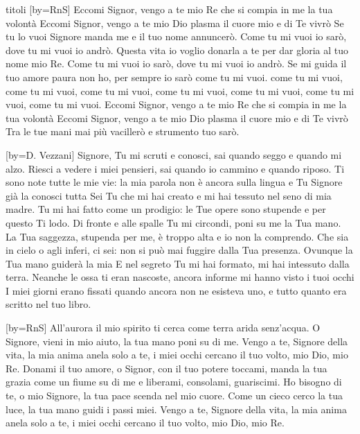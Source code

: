\begin{songs}{titoli}
[by={RnS}]
\beginverse
Eccomi Signor, vengo a te mio Re
che si compia in me la tua volontà
Eccomi Signor, vengo a te mio Dio
plasma il cuore mio e di Te vivrò
Se tu lo vuoi Signore manda me
e il tuo nome annuncerò.
\endverse
\beginchorus
Come tu mi vuoi io sarò,
dove tu mi vuoi io andrò.
Questa vita io voglio donarla a te
per dar gloria al tuo nome mio Re.
Come tu mi vuoi io sarò,
dove tu mi vuoi io andrò.
Se mi guida il tuo amore paura non ho,
per sempre io sarò
come tu mi vuoi.
come tu mi vuoi, come tu mi vuoi,
come tu mi vuoi, come tu mi vuoi,
come tu mi vuoi, come tu mi vuoi,
come tu mi vuoi.
\endchorus
\beginverse
Eccomi Signor, vengo a te mio Re
che si compia in me la tua volontà
Eccomi Signor, vengo a te mio Dio
plasma il cuore mio e di Te vivrò
Tra le tue mani mai più vacillerò
e strumento tuo sarò.
\endverse
\endsong

[by={D. Vezzani}]
\beginverse
Signore, Tu mi scruti e conosci,
sai quando seggo e quando mi alzo.
Riesci a vedere i miei pensieri,
sai quando io cammino e quando riposo.
Ti sono note tutte le mie vie:
la mia parola non è ancora sulla lingua
e Tu Signore già la conosci tutta
\endverse
\beginchorus
Sei Tu che mi hai creato
e mi hai tessuto nel seno di mia madre.
Tu mi hai fatto come un prodigio:
le Tue opere sono stupende e per questo Ti lodo.
\endchorus
\beginverse
Di fronte e alle spalle Tu mi circondi,
poni su me la Tua mano.
La Tua saggezza, stupenda per me,
è troppo alta e io non la comprendo.
Che sia in cielo o agli inferi, ci sei:
non si può mai fuggire dalla Tua presenza.
Ovunque la Tua mano guiderà la mia
\endverse
\beginverse
E nel segreto Tu mi hai formato,
mi hai intessuto dalla terra.
Neanche le ossa ti eran nascoste,
ancora informe mi hanno visto i tuoi occhi
I miei giorni erano fissati
quando ancora non ne esisteva uno,
e tutto quanto era scritto nel tuo libro.
\endverse
\endsong

[by={RnS}]
\beginverse
All'aurora il mio spirito ti cerca
come terra arida senz'acqua.
O Signore, vieni in mio aiuto,
la tua mano poni su di me.
\endverse
\beginverse*
Vengo a te, Signore della vita,
la mia anima anela solo a te,
i miei occhi cercano il tuo volto,
mio Dio, mio Re.
\endverse
\beginchorus
Donami il tuo amore, o Signor,
con il tuo potere toccami,
manda la tua grazia come un fiume su di me
e liberami, consolami, guariscimi.
\endchorus
\beginverse
Ho bisogno di te, o mio Signore,
la tua pace scenda nel mio cuore.
Come un cieco cerco la tua luce,
la tua mano guidi i passi miei.
\endverse
\beginverse*
Vengo a te, Signore della vita,
la mia anima anela solo a te,
i miei occhi cercano il tuo volto,
mio Dio, mio Re.
\endverse
\endsong


\end{songs}
